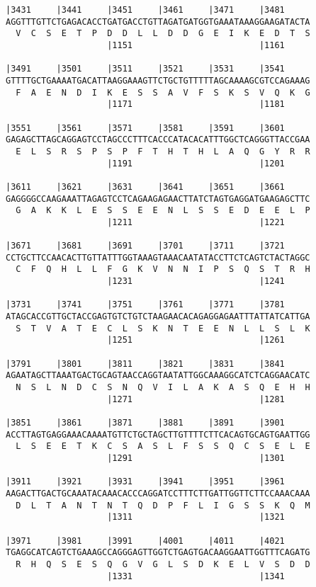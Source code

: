 \documentclass{article}
\begin{document}
\begin{Verbatim}
|3431     |3441     |3451     |3461     |3471     |3481     
AGGTTTGTTCTGAGACACCTGATGACCTGTTAGATGATGGTGAAATAAAGGAAGATACTA
  V  C  S  E  T  P  D  D  L  L  D  D  G  E  I  K  E  D  T  S
                    |1151                         |1161     
  
|3491     |3501     |3511     |3521     |3531     |3541     
GTTTTGCTGAAAATGACATTAAGGAAAGTTCTGCTGTTTTTAGCAAAAGCGTCCAGAAAG
  F  A  E  N  D  I  K  E  S  S  A  V  F  S  K  S  V  Q  K  G
                    |1171                         |1181     
  
|3551     |3561     |3571     |3581     |3591     |3601     
GAGAGCTTAGCAGGAGTCCTAGCCCTTTCACCCATACACATTTGGCTCAGGGTTACCGAA
  E  L  S  R  S  P  S  P  F  T  H  T  H  L  A  Q  G  Y  R  R
                    |1191                         |1201     
  
|3611     |3621     |3631     |3641     |3651     |3661     
GAGGGGCCAAGAAATTAGAGTCCTCAGAAGAGAACTTATCTAGTGAGGATGAAGAGCTTC
  G  A  K  K  L  E  S  S  E  E  N  L  S  S  E  D  E  E  L  P
                    |1211                         |1221     
  
|3671     |3681     |3691     |3701     |3711     |3721     
CCTGCTTCCAACACTTGTTATTTGGTAAAGTAAACAATATACCTTCTCAGTCTACTAGGC
  C  F  Q  H  L  L  F  G  K  V  N  N  I  P  S  Q  S  T  R  H
                    |1231                         |1241     
  
|3731     |3741     |3751     |3761     |3771     |3781     
ATAGCACCGTTGCTACCGAGTGTCTGTCTAAGAACACAGAGGAGAATTTATTATCATTGA
  S  T  V  A  T  E  C  L  S  K  N  T  E  E  N  L  L  S  L  K
                    |1251                         |1261     
  
|3791     |3801     |3811     |3821     |3831     |3841     
AGAATAGCTTAAATGACTGCAGTAACCAGGTAATATTGGCAAAGGCATCTCAGGAACATC
  N  S  L  N  D  C  S  N  Q  V  I  L  A  K  A  S  Q  E  H  H
                    |1271                         |1281     
  
|3851     |3861     |3871     |3881     |3891     |3901     
ACCTTAGTGAGGAAACAAAATGTTCTGCTAGCTTGTTTTCTTCACAGTGCAGTGAATTGG
  L  S  E  E  T  K  C  S  A  S  L  F  S  S  Q  C  S  E  L  E
                    |1291                         |1301     
  
|3911     |3921     |3931     |3941     |3951     |3961     
AAGACTTGACTGCAAATACAAACACCCAGGATCCTTTCTTGATTGGTTCTTCCAAACAAA
  D  L  T  A  N  T  N  T  Q  D  P  F  L  I  G  S  S  K  Q  M
                    |1311                         |1321     
  
|3971     |3981     |3991     |4001     |4011     |4021     
TGAGGCATCAGTCTGAAAGCCAGGGAGTTGGTCTGAGTGACAAGGAATTGGTTTCAGATG
  R  H  Q  S  E  S  Q  G  V  G  L  S  D  K  E  L  V  S  D  D
                    |1331                         |1341     
  

\end{Verbatim}
\end{document}
